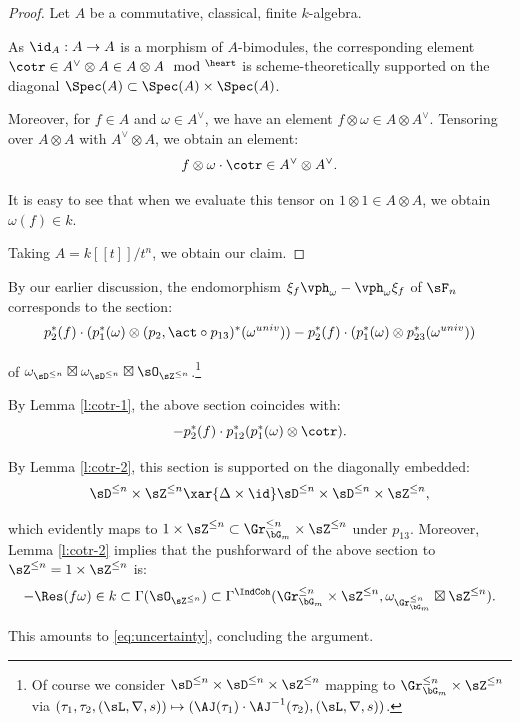 \begin{proof}

Let $A$ be a commutative, classical, finite $k$-algebra.

As $\id_A:A \to A$ is a morphism of $A$-bimodules,
the corresponding element $\cotr \in A^{\vee} \otimes A \in
A\otimes A\mod^{\heart}$ is scheme-theoretically
supported on the diagonal
$\Spec(A) \subset \Spec(A) \times \Spec(A)$.

Moreover, for $f \in A$ and $\omega \in A^{\vee}$, we
have an element $f \otimes \omega \in A \otimes A^{\vee}$.
Tensoring over $A\otimes A$ with $A^{\vee} \otimes A$,
we obtain an element:
%
\[
f\otimes \omega \cdot \cotr \in A^{\vee} \otimes A^{\vee}.
\]

 It is easy to see that when we evaluate this
tensor on $1 \otimes 1 \in A \otimes A$, we obtain
$\omega(f) \in k$.

Taking $A = k[[t]]/t^n$, we obtain our claim.

\end{proof}

By our earlier discussion, the endomorphism
$\xi_f \vph_{\omega}-\vph_{\omega}\xi_f$ of $\sF_n$
corresponds to the section:
%
\[
p_2^*(f) \cdot
(p_1^*(\omega) \otimes (p_2,\act \circ p_{13})^*(\omega^{univ})) -
p_2^*(f) \cdot
(p_1^*(\omega) \otimes p_{23}^*(\omega^{univ}))
\]

 of $\omega_{\sD^{\leq n}} \boxtimes
\omega_{\sD^{\leq n}} \boxtimes \sO_{\sZ^{\leq n}}$.\footnote{Of
course we consider
$\sD^{\leq n} \times \sD^{\leq n} \times
\sZ^{\leq n}$ mapping to $\Gr_{\bG_m}^{\leq n} \times \sZ^{\leq n}$
via $(\tau_1,\tau_2,(\sL,\nabla,s)) \mapsto
(\AJ(\tau_1)\cdot\AJ^{-1}(\tau_2),(\sL,\nabla,s))$.}

By Lemma \ref{l:cotr-1}, the above section coincides with:
%
\[
-p_2^*(f) \cdot p_{12}^*(p_1^*(\omega)\otimes\cotr).
\]

 By Lemma \ref{l:cotr-2}, this section is supported
on the diagonally embedded:
%
\[
\sD^{\leq n} \times \sZ^{\leq n}
\xar{\Delta \times \id}
\sD^{\leq n} \times \sD^{\leq n} \times \sZ^{\leq n},
\]

 which evidently
maps to $1 \times \sZ^{\leq n} \subset \Gr_{\bG_m}^{\leq n} \times \sZ^{\leq n}$
under $p_{13}$. Moreover, Lemma \ref{l:cotr-2} implies that the
pushforward of the above section to $\sZ^{\leq n} = 1 \times \sZ^{\leq n}$
is:
%
\[
-\Res(f\omega) \in k \subset \Gamma(\sO_{\sZ^{\leq n}}) \subset
\Gamma^{\IndCoh}(\Gr_{\bG_m}^{\leq n} \times \sZ^{\leq n},
\omega_{\Gr_{\bG_m}^{\leq n}} \boxtimes \sZ^{\leq n}).
\]

 This amounts to \eqref{eq:uncertainty}, concluding
the argument.




%
%
%
